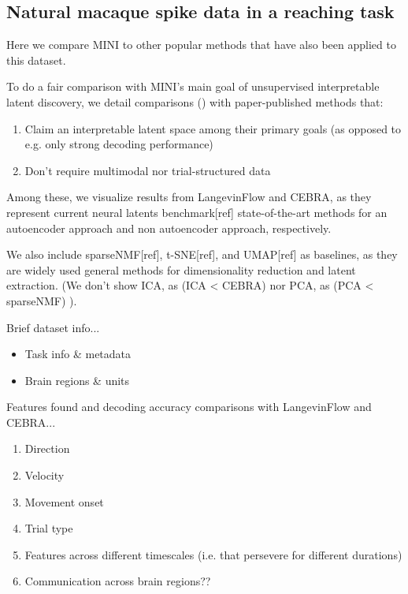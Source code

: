 \subsection{Natural macaque spike data in a reaching task}

Here we compare MINI to other popular methods that have also been applied to this dataset.

To do a fair comparison with MINI's main goal of unsupervised interpretable latent discovery, we detail comparisons () with paper-published methods that:

\begin{enumerate}
\item Claim an interpretable latent space among their primary goals (as opposed to e.g. only strong decoding performance)
\item Don't require multimodal nor trial-structured data
\end{enumerate}
    
Among these, we visualize results from LangevinFlow and CEBRA, as they represent current neural latents benchmark[ref] state-of-the-art methods for an autoencoder approach and non autoencoder approach, respectively. 

We also include sparseNMF[ref], t-SNE[ref], and UMAP[ref] as baselines, as they are widely used general methods for dimensionality reduction and latent extraction.
(We don't show ICA, as (ICA < CEBRA) nor PCA, as (PCA < sparseNMF) ).

Brief dataset info...
\begin{itemize}
    \item Task info \& metadata
    \item Brain regions \& units
\end{itemize}

Features found and decoding accuracy comparisons with LangevinFlow and CEBRA...
\begin{enumerate}
    \item Direction
    \item Velocity
    \item Movement onset
    \item Trial type
    \item Features across different timescales (i.e. that persevere for different durations)
    \item Communication across brain regions??
\end{enumerate}

